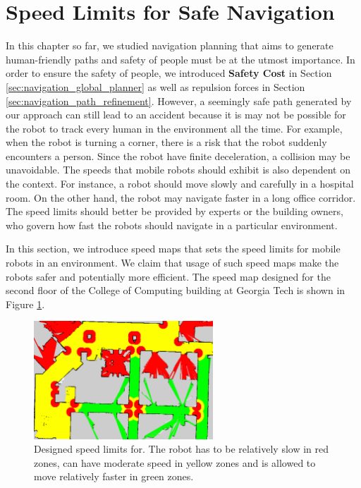 \section{Speed Limits for Safe Navigation}
\label{sec:navigation_speed_limits}

In this chapter so far, we studied navigation planning that aims to generate human-friendly paths and safety of people must be at the utmost importance. In order to ensure the safety of people, we introduced \textbf{Safety Cost} in Section \ref{sec:navigation_global_planner} as well as repulsion forces in Section \ref{sec:navigation_path_refinement}. However, a seemingly safe path generated by our approach can still lead to an accident because it is may not be possible for the robot to track every human in the environment all the time. For example, when the robot is turning a corner, there is a risk that the robot suddenly encounters a person. Since the robot have finite deceleration, a collision may be unavoidable. The speeds that mobile robots should exhibit is also dependent on the context. For instance, a robot should move slowly and carefully in a hospital room. On the other hand, the robot may navigate faster in a long office corridor. The speed limits should better be provided by experts or the building owners, who govern how fast the robots should navigate in a particular environment.

In this section, we introduce speed maps that sets the speed limits for mobile robots in an environment. We claim that usage of such speed maps make the robots safer and potentially more efficient. The speed map designed for the second floor of the College of Computing building at Georgia Tech is shown in Figure \ref{fig:speed_map_irim}.

\begin{figure}[h!]
\centering
\includegraphics[width=0.6\textwidth]{pics/intro}
\caption{Designed speed limits for. The robot has to be relatively slow in red zones, can have moderate speed in yellow zones and is allowed to move relatively faster in green zones.}
\label{fig:speed_map_irim}
\end{figure}

